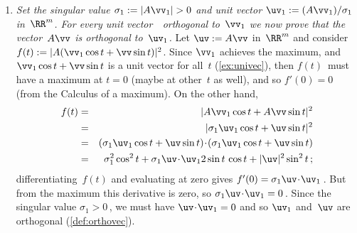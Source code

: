 \begin{enumerate}
\item \emph{Set the singular value \(\sigma_1:=|A\vv_1|>0\) and unit vector \(\uv_1:=(A\vv_1)/\sigma_1\) in~\(\RR^m\). 
For every unit vector~\vv\ orthogonal to~\(\vv_1\) we now prove that the vector~\(A\vv\) is orthogonal to~\(\uv_1\).}
Let \(\uv:=A\vv\) in~\(\RR^m\) and consider \(f(t):=|A(\vv_1\cos t+\vv\sin t)|^2\).
Since \(\vv_1\) achieves the maximum, and \(\vv_1\cos t+\vv\sin t\) is a unit vector for all~\(t\) (\autoref{ex:univec}), then \(f(t)\)~must have a maximum at \(t=0\) (maybe at other~\(t\) as well), and so \(f'(0)=0\) (from the Calculus of a maximum).
On the other hand, 
\begin{eqnarray*}
f(t)&=&|A\vv_1\cos t+A\vv\sin t|^2
\\&=&|\sigma_1\uv_1\cos t+\uv\sin t|^2
\\&=&(\sigma_1\uv_1\cos t+\uv\sin t)\cdot(\sigma_1\uv_1\cos t+\uv\sin t)
\\&=&\sigma_1^2\cos^2 t+\sigma_1\uv\cdot\uv_12\sin t\,\cos t+|\uv|^2\sin^2 t
\,;
\end{eqnarray*}
differentiating~\(f(t)\) and evaluating at zero gives
\(f'(0)=\sigma_1\uv\cdot\uv_1\)\,.
But from the maximum this derivative is zero, so \(\sigma_1\uv\cdot\uv_1=0\)\,.
Since the singular value \(\sigma_1>0\)\,, we must have \(\uv\cdot\uv_1=0\) and so \(\uv_1\) and~\(\uv\) are orthogonal (\autoref{def:orthovec}).


\end{enumerate}
